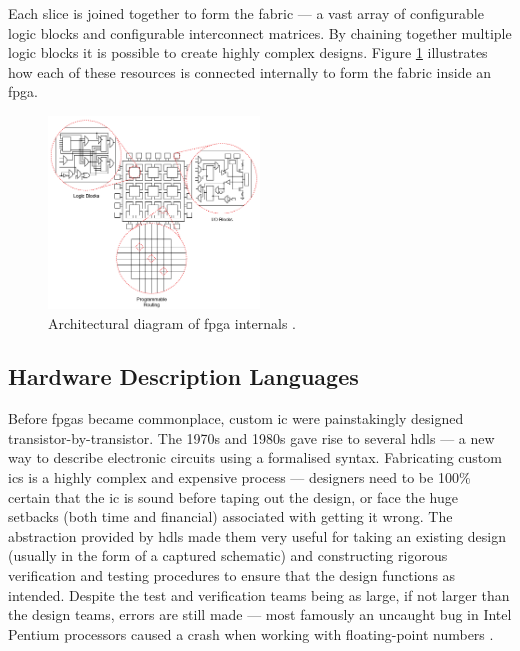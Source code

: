 Each slice is joined together to form the fabric --- a vast array of configurable logic blocks and configurable interconnect matrices. By chaining together multiple logic blocks it is possible to create highly complex designs. Figure \ref{fig:fpga_diagram} illustrates how each of these resources is connected internally to form the fabric inside an \gls{fpga}. 

\begin{figure}
  \centering
  \includegraphics[width=0.5\textwidth]{./img/fpga_arch_diagram.png}
  \caption{Architectural diagram of \gls{fpga} internals \cite{ni_fpga_slice}.}
  \label{fig:fpga_diagram}
\end{figure}

\subsection{Hardware Description Languages}
Before \glspl{fpga} became commonplace, custom \gls{ic} were painstakingly designed transistor-by-transistor. The 1970s and 1980s gave rise to several \glspl{hdl} --- a new way to describe electronic circuits using a formalised syntax. Fabricating custom \glspl{ic} is a highly complex and expensive process --- designers need to be 100\% certain that the \gls{ic} is sound before taping out the design, or face the huge setbacks (both time and financial) associated with getting it wrong. The abstraction provided by \glspl{hdl} made them very useful for taking an existing design (usually in the form of a captured schematic) and constructing rigorous verification and testing procedures to ensure that the design functions as intended. Despite the test and verification teams being as large, if not larger than the design teams, errors are still made --- most famously an uncaught bug in Intel Pentium processors caused a crash when working with floating-point numbers \cite{intel_floating_point}. 


